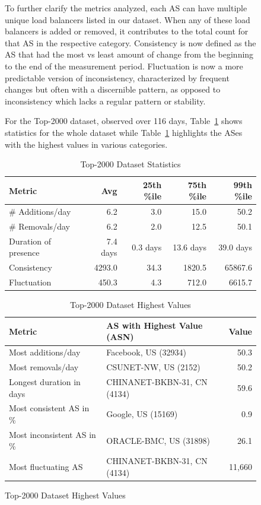 \documentclass[12pt]{cwru_thesis}
\begin{document}
\begin{figure}[h!]
To further clarify the metrics analyzed, each AS can have multiple unique load balancers listed in our dataset. When any of these load balancers is added or removed, it contributes to the total count for that AS in the respective category. Consistency is now defined as the AS that had the most vs least amount of change from the beginning to the end of the measurement period. Fluctuation is now a more predictable version of inconsistency, characterized by frequent changes but often with a discernible pattern, as opposed to inconsistency which lacks a regular pattern or stability.

For the Top-2000 dataset, observed over 116 days, Table~\ref{tab:top-2000-stats} shows statistics for the whole dataset while Table~\ref{tab:top-2000-highest} highlights the ASes with the highest values in various categories.

\begin{table}[h!]
    \centering
    \begin{tabular}{|l|r|r|r|r|}
        \hline
        \textbf{Metric} & \textbf{Avg} & \textbf{25th \%ile} & \textbf{75th \%ile} & \textbf{99th \%ile} \\
        \hline
        \# Additions/day & 6.2 & 3.0 & 15.0 & 50.2 \\
        \hline
        \# Removals/day & 6.2 & 2.0 & 12.5 & 50.1 \\
        \hline
        Duration of presence & 7.4 days & 0.3 days & 13.6 days & 39.0 days \\
        \hline
        Consistency & 4293.0 & 34.3 & 1820.5 & 65867.6 \\
        \hline
        Fluctuation & 450.3 & 4.3 & 712.0 & 6615.7 \\
        \hline
    \end{tabular}
    \caption{Top-2000 Dataset Statistics}
    \label{tab:top-2000-stats}
\end{table}


\begin{table}[h!]
    \centering
    \begin{tabular}{|l|l|r|}
        \hline
        \textbf{Metric} & \textbf{AS with Highest Value (ASN)} & \textbf{Value} \\
        \hline
        Most additions/day & Facebook, US (32934) & 50.3 \\
        \hline
        Most removals/day & CSUNET-NW, US (2152) & 50.2 \\
        \hline
        Longest duration in days & CHINANET-BKBN-31, CN (4134) & 59.6 \\
        \hline
        Most consistent AS in \% & Google, US (15169) & 0.9 \\
        \hline
        Most inconsistent AS in \% & ORACLE-BMC, US (31898) & 26.1 \\
        \hline
        Most fluctuating AS & CHINANET-BKBN-31, CN (4134) & 11,660 \\
        \hline
    \end{tabular}
    \caption{Top-2000 Dataset Highest Values}
    \label{tab:top-2000-highest}
\end{table} 


\end{figure}
\end{document}

